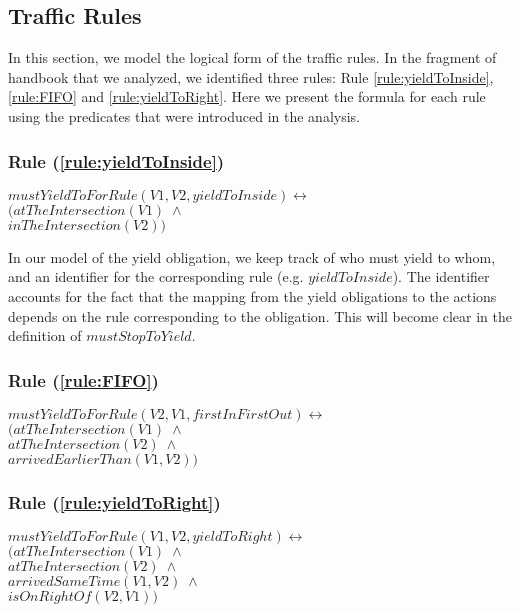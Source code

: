 \subsection{Traffic Rules}
In this section,
we model the logical form of
the traffic rules.
In the fragment of handbook that we analyzed,
we identified three rules:
Rule \ref{rule:yieldToInside},
\ref{rule:FIFO} and \ref{rule:yieldToRight}.
Here we present the formula for each rule
using the predicates that were introduced in the analysis.
\subsubsection{Rule (\ref{rule:yieldToInside})}
\begin{center}
    $ mustYieldToForRule(V1, V2, yieldToInside) \leftrightarrow $ \\
    $ \Big( atTheIntersection(V1) \; \land $\\
    $ inTheIntersection(V2) \Big) $

\end{center}
In our model of the yield obligation,
we keep track of who must yield to whom,
and an identifier for the corresponding rule
(e.g. $yieldToInside$).
The identifier accounts for the fact that
the mapping from the yield obligations to the actions
depends on the rule corresponding to the obligation.
This will become clear in the definition of
$mustStopToYield$.

\subsubsection{Rule (\ref{rule:FIFO})}
\begin{center}
    $ mustYieldToForRule(V2, V1, firstInFirstOut) \leftrightarrow $ \\
    $ \Big( atTheIntersection(V1) \; \land $\\
    $ atTheIntersection(V2) \; \land $\\
    $ arrivedEarlierThan(V1, V2) \Big) $
\end{center}

\subsubsection{Rule (\ref{rule:yieldToRight})}
\begin{center}
    $ mustYieldToForRule(V1, V2, yieldToRight) \leftrightarrow $ \\
    $ \Big( atTheIntersection(V1) \; \land $\\
    $ atTheIntersection(V2) \; \land $\\
    $ arrivedSameTime(V1, V2) \; \land $\\
    $ isOnRightOf(V2, V1) \Big) $
\end{center}

